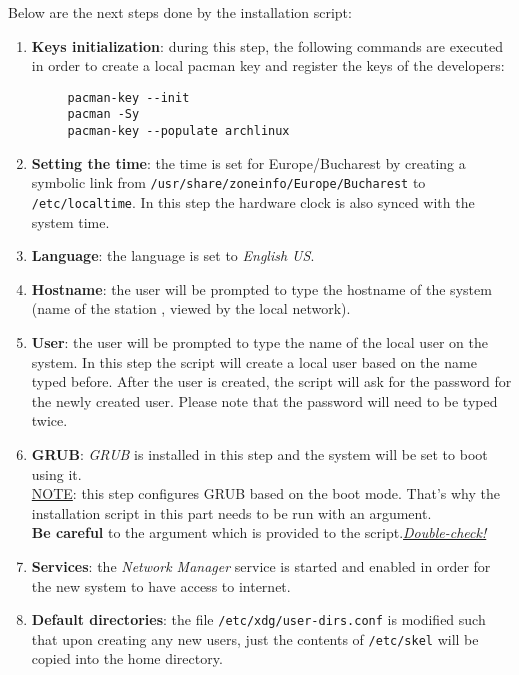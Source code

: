 \documentclass{article}
\begin{document}
\noindent Below are the next steps done by the installation script:
\begin{enumerate}
	\item \textbf{Keys initialization}: during this step, the following commands are executed in order to create 
	a local pacman key and register the keys of the developers:
	\begin{lstlisting}
     pacman-key --init
     pacman -Sy
     pacman-key --populate archlinux
	\end{lstlisting}
	
	\item \textbf{Setting the time}: the time is set for Europe/Bucharest by creating a symbolic link from
	\texttt{/usr/share/zoneinfo/Europe/Bucharest} to\\
	\texttt{/etc/localtime}. In this step the hardware clock is also synced with the system time.
	
	\item \textbf{Language}: the language is set to \textit{English US}.
	
	\item \textbf{Hostname}: the user will be prompted to type the hostname of the system (name of the station
	, viewed by the local network).
	
	\item \textbf{User}: the user will be prompted to type the name of the local user on the system. In this step
	the script will create a local user based on the name typed before. After the user is created, the script will
	ask for the password for the newly created user. Please note that the password will need to be typed twice.
	
	\item \textbf{GRUB}: \textit{GRUB} is installed in this step and the system will be set to boot using it.\\
	\newline
	\underline{NOTE}: this step configures GRUB based on the boot mode. That's why the installation script in
	this part needs to be run with an argument.\\
	\textbf{Be careful} to the argument which is provided to the script.\underline{\textit{Double-check!}} 
	
	\item \textbf{Services}: the \textit{Network Manager} service is started and enabled in order for the new
	system to have access to internet.
	
	\item \textbf{Default directories}: the file \texttt{/etc/xdg/user-dirs.conf} is modified such that upon
	creating any new users, just the contents of \texttt{/etc/skel} will be copied into the home directory.
	

\end{enumerate}
\end{document}
